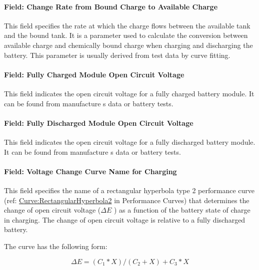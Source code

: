 \paragraph{Field: Change Rate from Bound Charge to Available Charge}\label{field-change-rate-from-bound-charge-to-available-charge}

This field specifies the rate at which the charge flows between the available tank and the bound tank. It is a parameter used to calculate the conversion between available charge and chemically bound charge when charging and discharging the battery. This parameter is usually derived from test data by curve fitting.

\paragraph{Field: Fully Charged Module Open Circuit Voltage}\label{field-fully-charged-module-open-circuit-voltage}

This field indicates the open circuit voltage for a fully charged battery module. It can be found from manufacture s data or battery tests.

\paragraph{Field: Fully Discharged Module Open Circuit Voltage}\label{field-fully-discharged-module-open-circuit-voltage}

This field indicates the open circuit voltage for a fully discharged battery module. It can be found from manufacture s data or battery tests.

\paragraph{Field: Voltage Change Curve Name for Charging}\label{field-voltage-change-curve-name-for-charging}

This field specifies the name of a rectangular hyperbola type 2 performance curve (ref: \hyperref[curverectangularhyperbola2]{Curve:RectangularHyperbola2} in Performance Curves) that determines the change of open circuit voltage (\(\Delta E\) ) as a function of the battery state of charge in charging. The change of open circuit voltage is relative to a fully discharged battery.

The curve has the following form:

\begin{equation}
\Delta E = ({C_1}*X)/({C_2} + X) + {C_3}*X
\end{equation}

